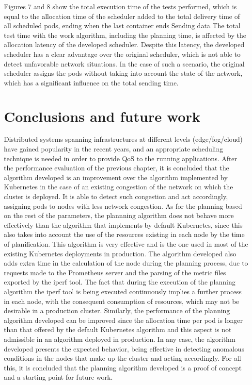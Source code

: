 \documentclass[conference]{IEEEtran}
\begin{document}
Figures 7 and 8 show the total execution time of the tests performed, which is equal to the allocation time of the scheduler added to the total delivery time of all scheduled pods, ending when the last container ends Sending data The total test time with the work algorithm, including the planning time, is affected by the allocation latency of the developed scheduler. Despite this latency, the developed scheduler has a clear advantage over the original scheduler, which is not able to detect unfavorable network situations. In the case of such a scenario, the original scheduler assigns the pods without taking into account the state of the network, which has a significant influence on the total sending time.

\section{Conclusions and future work}\label{sec:conc}

Distributed systems spanning infrastructures at different levels (edge/fog/cloud) have gained popularity in the recent years, and an appropriate scheduling technique is needed in order to provide QoS to the running applications. After the performance evaluation of the previous chapter, it is concluded that the algorithm developed is an improvement over the algorithm implemented by Kubernetes in the case 
of an existing congestion of the network on which the cluster is deployed. It is able to detect such congestion and act accordingly, assigning pods to nodes with less network congestion. As for the planning based on the rest of the parameters, the plannning algorithm does not behave more effectively than the algorithm that implements by default Kubernetes, since this also takes into account the use of the resources existing in each node by the time of planification. This algorithm is very effective and is the one used in most of the existing Kubernetes deployments in production. The algorithm developed also adds extra time in the calculation of the node during the planning process, due to requests made to the Prometheus server and the parsing of the metric files exported by the iperf tool. The fact that during the execution of the planning algorithm the iperf tool is being executed continuously implies a further process in each node, with the consequent consumption of resources, which may not be desirable in a production cluster. Similarly, the performance of the planning algorithm developed can be improved since the allocation time per pod is longer than that offered by the default Kubernetes 
algorithm and this aspect is not admissible in an algorithm deployed in production. In any case, the algorithm developed presents the expected behavior, being effective in detecting anomalous conditions in 
the nodes that make up the cluster and acting accordingly. For all this, it is concluded that the planning algorithm developed is a proof of concept and a starting point for future work.
\end{document}
